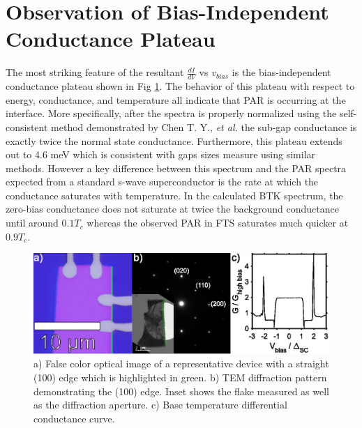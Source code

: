 \section{Observation of Bias-Independent Conductance Plateau}
The most striking feature of the resultant $\frac{dI}{dV}$ vs $v_{bias}$ is the bias-independent conductance plateau shown in Fig \ref{fig:PARDeviceFab}. The behavior of this plateau with respect to energy, conductance, and temperature all indicate that \ac{PAR} is occurring at the interface. More specifically, after the spectra is properly normalized using the self-consistent method demonstrated by Chen T. Y., \textit{et al.} \cite{Chen2010} the sub-gap conductance is exactly twice the normal state conductance. Furthermore, this plateau extends out to 4.6 meV which is consistent with gaps sizes measure using similar methods\cite{Tang2019}. However a key difference between this spectrum and the \ac{PAR} spectra expected from a standard s-wave superconductor is the rate at which the conductance saturates with temperature. In the calculated \ac{BTK} spectrum, the zero-bias conductance does not saturate at twice the background conductance until around $0.1T_{c}$ whereas the observed \ac{PAR} in \ac{FTS} saturates much quicker at $0.9T_{c}$. 
\begin{figure}
    \centering
    \includegraphics[width = \textwidth]{Chap4/Figures/DeviceFab.eps}
    \caption{a) False color optical image of a representative device with a straight (100) edge which is highlighted in green. b) \ac{TEM} diffraction pattern demonstrating the (100) edge. Inset shows the flake measured as well as the diffraction aperture. c) Base temperature differential conductance curve.}
    \label{fig:PARDeviceFab}
\end{figure}
